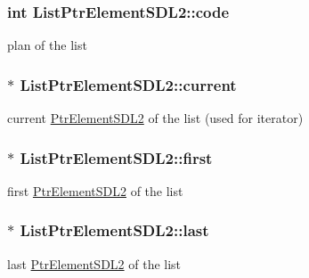 \subsubsection[{\texorpdfstring{code}{code}}]{\setlength{\rightskip}{0pt plus 5cm}int List\+Ptr\+Element\+S\+D\+L2\+::code}\hypertarget{structListPtrElementSDL2_aaaf9f2fe9741abeb45133989b00fec00}{}\label{structListPtrElementSDL2_aaaf9f2fe9741abeb45133989b00fec00}
plan of the list 
\subsubsection[{\texorpdfstring{current}{current}}]{$\ast$ List\+Ptr\+Element\+S\+D\+L2\+::current}\hypertarget{structListPtrElementSDL2_aed8b7b9ca4455c05f016dd8089925ba6}{}\label{structListPtrElementSDL2_aed8b7b9ca4455c05f016dd8089925ba6}
current \hyperlink{structPtrElementSDL2}{Ptr\+Element\+S\+D\+L2} of the list (used for iterator) 
\subsubsection[{\texorpdfstring{first}{first}}]{$\ast$ List\+Ptr\+Element\+S\+D\+L2\+::first}\hypertarget{structListPtrElementSDL2_ac6e082dab2ed9516795b21b841a7808f}{}\label{structListPtrElementSDL2_ac6e082dab2ed9516795b21b841a7808f}
first \hyperlink{structPtrElementSDL2}{Ptr\+Element\+S\+D\+L2} of the list 
\subsubsection[{\texorpdfstring{last}{last}}]{$\ast$ List\+Ptr\+Element\+S\+D\+L2\+::last}\hypertarget{structListPtrElementSDL2_a75a0428e9ce2b7ac513817bb7eb14166}{}\label{structListPtrElementSDL2_a75a0428e9ce2b7ac513817bb7eb14166}
last \hyperlink{structPtrElementSDL2}{Ptr\+Element\+S\+D\+L2} of the list 
